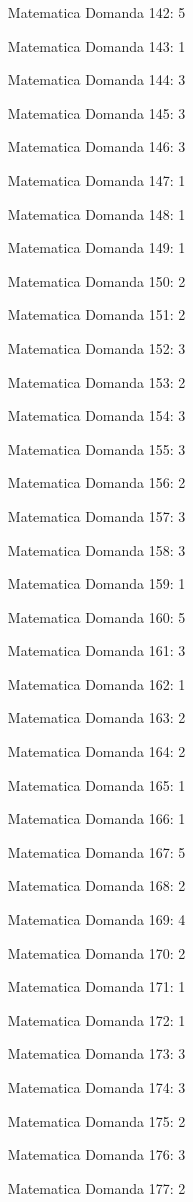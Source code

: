 \documentclass[20pt, a4paper]{article}
\begin{document}
\begin{itemize}[leftmargin=*]
\item [Matematica] Domanda 142: 5
\item [Matematica] Domanda 143: 1
\item [Matematica] Domanda 144: 3
\item [Matematica] Domanda 145: 3
\item [Matematica] Domanda 146: 3
\item [Matematica] Domanda 147: 1
\item [Matematica] Domanda 148: 1
\item [Matematica] Domanda 149: 1
\item [Matematica] Domanda 150: 2
\item [Matematica] Domanda 151: 2
\item [Matematica] Domanda 152: 3
\item [Matematica] Domanda 153: 2
\item [Matematica] Domanda 154: 3
\item [Matematica] Domanda 155: 3
\item [Matematica] Domanda 156: 2
\item [Matematica] Domanda 157: 3
\item [Matematica] Domanda 158: 3
\item [Matematica] Domanda 159: 1
\item [Matematica] Domanda 160: 5
\item [Matematica] Domanda 161: 3
\item [Matematica] Domanda 162: 1
\item [Matematica] Domanda 163: 2
\item [Matematica] Domanda 164: 2
\item [Matematica] Domanda 165: 1
\item [Matematica] Domanda 166: 1
\item [Matematica] Domanda 167: 5
\item [Matematica] Domanda 168: 2
\item [Matematica] Domanda 169: 4
\item [Matematica] Domanda 170: 2
\item [Matematica] Domanda 171: 1
\item [Matematica] Domanda 172: 1
\item [Matematica] Domanda 173: 3
\item [Matematica] Domanda 174: 3
\item [Matematica] Domanda 175: 2
\item [Matematica] Domanda 176: 3
\item [Matematica] Domanda 177: 2

\end{itemize}
\end{document}
